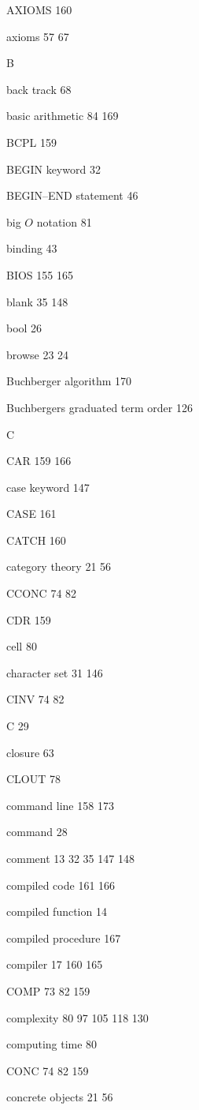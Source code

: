 \item AXIOMS 160
\item axioms  57 67
\indexspace
\item {\Large B}
\item back track 68
\item basic arithmetic  84 169
\item BCPL 159
\item BEGIN keyword 32
\item BEGIN--END statement 46
\item big $O$ notation 81
\item binding 43
\item BIOS  155 165
\item blank  35 148
\item bool 26
\item browse  23 24
\item Buchberger algorithm 170
\item Buchbergers graduated term order 126
\indexspace
\item {\Large C}
\item CAR  159 166
\item case keyword 147
\item CASE 161
\item CATCH 160
\item category theory  21 56
\item CCONC  74 82
\item CDR 159
\item cell 80
\item character set  31 146
\item CINV  74 82
\item C 29
\item closure 63
\item CLOUT 78
\item command line  158 173
\item command 28
\item comment  13 32 35 147 148
\item compiled code  161 166
\item compiled function 14
\item compiled procedure 167
\item compiler  17  160 165
\item COMP  73 82 159
\item complexity  80 97  105 118 130
\item computing time 80
\item CONC  74 82 159
\item concrete objects  21 56
